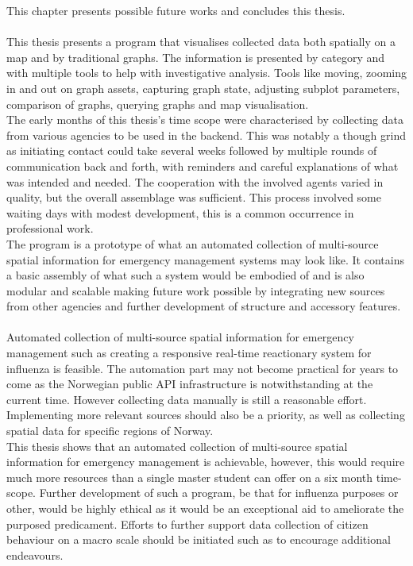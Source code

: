 This chapter presents possible future works and concludes this thesis.
\\
\\
This thesis presents a program that visualises collected data both spatially on a map and by traditional graphs. The information is presented by category and with multiple tools to help with investigative analysis. Tools like moving, zooming in and out on graph assets, capturing graph state, adjusting subplot parameters, comparison of graphs, querying graphs and map visualisation.
\\
The early months of this thesis's time scope were characterised by collecting data from various agencies to be used in the backend. This was notably a though grind as initiating contact could take several weeks followed by multiple rounds of communication back and forth, with reminders and careful explanations of what was intended and needed. The cooperation with the involved agents varied in quality, but the overall assemblage was sufficient. This process involved some waiting days with modest development, this is a common occurrence in professional work.
\\
The program is a prototype of what an automated collection of multi-source spatial information for emergency management systems may look like. It contains a basic assembly of what such a system would be embodied of and is also modular and scalable making future work possible by integrating new sources from other agencies and further development of structure and accessory features.
\\
\\
Automated collection of multi-source spatial information for emergency management such as creating a responsive real-time reactionary system for influenza is feasible.
The automation part may not become practical for years to come as the Norwegian public API infrastructure is notwithstanding at the current time. However collecting data manually is still a reasonable effort. Implementing more relevant sources should also be a priority, as well as collecting spatial data for specific regions of Norway.
\\
This thesis shows that an automated collection of multi-source spatial information for emergency management is achievable, however, this would require much more resources than a single master student can offer on a six month time-scope. Further development of such a program, be that for influenza purposes or other, would be highly ethical as it would be an exceptional aid to ameliorate the purposed predicament. Efforts to further support data collection of citizen behaviour on a macro scale should be initiated such as to encourage additional endeavours.

